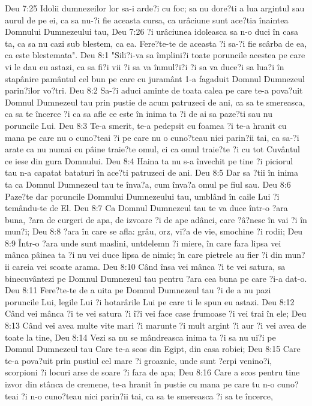 Deu 7:25  Idolii dumnezeilor lor sa-i arde?i cu foc; sa nu dore?ti a lua argintul sau aurul de pe ei, ca sa nu-?i fie aceasta cursa, ca urâciune sunt ace?tia înaintea Domnului Dumnezeului tau,
Deu 7:26  ?i urâciunea idoleasca sa n-o duci în casa ta, ca sa nu cazi sub blestem, ca ea. Fere?te-te de aceasta ?i sa-?i fie scârba de ea, ca este blestemata".
Deu 8:1  "Sili?i-va sa împlini?i toate poruncile acestea pe care vi le dau eu astazi, ca sa fi?i vii ?i sa va înmul?i?i ?i sa va duce?i sa lua?i în stapânire pamântul cel bun pe care cu juramânt 1-a fagaduit Domnul Dumnezeul parin?ilor vo?tri.
Deu 8:2  Sa-?i aduci aminte de toata calea pe care te-a pova?uit Domnul Dumnezeul tau prin pustie de acum patruzeci de ani, ca sa te smereasca, ca sa te încerce ?i ca sa afle ce este în inima ta ?i de ai sa paze?ti sau nu poruncile Lui.
Deu 8:3  Te-a smerit, te-a pedepsit cu foamea ?i te-a hranit cu mana pe care nu o cuno?teai ?i pe care nu o cuno?teau nici parin?ii tai, ca sa-?i arate ca nu numai cu pâine traie?te omul, ci ca omul traie?te ?i cu tot Cuvântul ce iese din gura Domnului.
Deu 8:4  Haina ta nu s-a învechit pe tine ?i piciorul tau n-a capatat bataturi în ace?ti patruzeci de ani.
Deu 8:5  Dar sa ?tii în inima ta ca Domnul Dumnezeul tau te înva?a, cum înva?a omul pe fiul sau.
Deu 8:6  Paze?te dar poruncile Domnului Dumnezeului tau, umblând în caile Lui ?i temându-te de El.
Deu 8:7  Ca Domnul Dumnezeul tau te va duce într-o ?ara buna, ?ara de curgeri de apa, de izvoare ?i de ape adânci, care ?â?nesc în vai ?i în mun?i;
Deu 8:8  ?ara în care se afla: grâu, orz, vi?a de vie, smochine ?i rodii;
Deu 8:9  Într-o ?ara unde sunt maslini, untdelemn ?i miere, în care fara lipsa vei mânca pâinea ta ?i nu vei duce lipsa de nimic; în care pietrele au fier ?i din mun?ii careia vei scoate arama.
Deu 8:10  Când însa vei mânca ?i te vei satura, sa binecuvântezi pe Domnul Dumnezeul tau pentru ?ara cea buna pe care ?i-a dat-o.
Deu 8:11  Fere?te-te de a uita pe Domnul Dumnezeul tau ?i de a nu pazi poruncile Lui, legile Lui ?i hotarârile Lui pe care ti le spun eu astazi.
Deu 8:12  Când vei mânca ?i te vei satura ?i î?i vei face case frumoase ?i vei trai în ele;
Deu 8:13  Când vei avea multe vite mari ?i marunte ?i mult argint ?i aur ?i vei avea de toate la tine,
Deu 8:14  Vezi sa nu se mândreasca inima ta ?i sa nu ui?i pe Domnul Dumnezeul tau Care te-a scos din Egipt, din casa robiei;
Deu 8:15  Care te-a pova?uit prin pustiul cel mare ?i groaznic, unde sunt ?erpi venino?i, scorpioni ?i locuri arse de soare ?i fara de apa;
Deu 8:16  Care a scos pentru tine izvor din stânca de cremene, te-a hranit în pustie cu mana pe care tu n-o cuno?teai ?i n-o cuno?teau nici parin?ii tai, ca sa te smereasca ?i sa te încerce,
